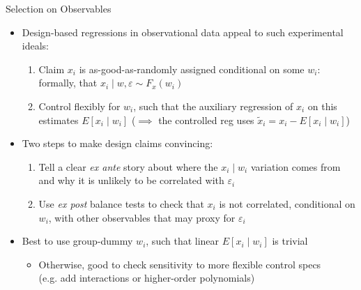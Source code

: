 \documentclass[11pt,english]{beamer}
\begin{document}
\begin{frame}{Selection on Observables}
\begin{itemize}
\item Design-based regressions in observational data appeal to such experimental ideals:\smallskip
\begin{enumerate}
\item Claim $x_i$ is as-good-as-randomly assigned conditional on some $w_i$: formally, that $x_i \mid w,\varepsilon \sim F_x(w_i)$\smallskip\pause{}
\item Control flexibly for $w_i$, such that the auxiliary regression of $x_i$ on this estimates $E[x_i\mid w_i]$ ($\implies$ the controlled reg uses $\tilde{x}_i=x_i-E[x_i\mid w_i]$)
\end{enumerate}\medskip\pause{}
\item Two steps to make design claims convincing: \smallskip\pause{}
\begin{enumerate}
\item Tell a clear \emph{ex ante} story about where the $x_i\mid w_i$ variation comes from and why it is unlikely to be correlated with $\varepsilon_i$\smallskip\pause{}
\item Use \emph{ex post} balance tests to check that $x_i$ is not correlated, conditional on $w_i$, with other observables that may proxy for $\varepsilon_i$
\end{enumerate}\medskip\pause{}
\item Best to use group-dummy $w_i$, such that linear $E[x_i\mid w_i]$ is trivial\smallskip
\begin{itemize}
\item Otherwise, good to check sensitivity to more flexible control specs \\ (e.g. add interactions or higher-order polynomials)
\end{itemize}
\end{itemize}
\end{frame}
\end{document}
